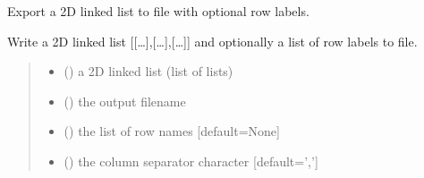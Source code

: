 \documentclass[letterpaper,12pt,english]{sphinxmanual}
\begin{document}
\begin{fulllineitems}
\label{\detokenize{api/core:cbmpy.CBTools.exportLabelledLinkedList}}
\pysigstartsignatures
\pysiglinewithargsret
{}
{\sphinxparamcomma {}\sphinxparamcomma {}\sphinxparamcomma {}\sphinxparamcomma {}\sphinxparamcomma {}}
{}
\pysigstopsignatures
\sphinxAtStartPar
Export a 2D linked list to file with optional row labels.

\sphinxAtStartPar
Write a 2D linked list {[}{[}…{]},{[}…{]},{[}…{]}{]} and optionally a list of row labels to file.
\begin{quote}\begin{description}
\begin{itemize}
\item {} 
\sphinxAtStartPar
{} () \textendash{} a 2D linked list (list of lists)

\item {} 
\sphinxAtStartPar
{} () \textendash{} the output filename

\item {} 
\sphinxAtStartPar
{} (\sphinxstyleliteralemphasis{\sphinxupquote{, }}) \textendash{} the list of row names {[}default=None{]}

\item {} 
\sphinxAtStartPar
{} (\sphinxstyleliteralemphasis{\sphinxupquote{, }}) \textendash{} the column separator character {[}default=’,’{]}


\end{itemize}
\end{description}
\end{quote}
\end{fulllineitems}
\end{document}
